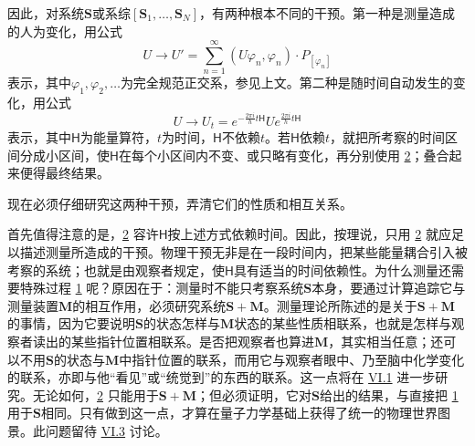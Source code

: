 \documentclass[fontsize=13pt,twoside,openany,headings=normal,parskip=false,bookmarkpackage=false,DIV=calc]{scrbook}
\begin{document}
因此，对系统$\boldsymbol{S}$或系综$[\boldsymbol{S}_1,\allowbreak \ldots,\allowbreak \boldsymbol{S}_N]$，有两种根本不同的干预。第一种是测量造成的人为变化，用公式
\begin{equation}\tag{1}\label{eq:V.1.1}
U\longrightarrow U'=\sum_{n=1}^{\infty}(U\varphi_n,\varphi_n)\cdot P_{[\varphi_n]}
\end{equation}
表示，其中$\varphi_1,\allowbreak \varphi_2,\allowbreak \ldots$为完全规范正交系，参见上文。第二种是随时间自动发生的变化，用公式
\begin{equation}\tag{2}\label{eq:V.1.2}
U\longrightarrow U_t=e^{-\frac{2\pi i}{h}t\mathsf{H}}Ue^{\frac{2\pi i}{h}t\mathsf{H}}
\end{equation}\hypertarget{origpage-187}{}\label{origpage-187}表示，其中$\mathsf{H}$为能量算符，$t$为时间，$\mathsf{H}$不依赖$t$。若$\mathsf{H}$依赖$t$，就把所考察的时间区间分成小区间，使$\mathsf{H}$在每个小区间内不变、或只略有变化，再分别使用 \hyperref[eq:V.1.2]{2}；叠合起来便得最终结果。

现在必须仔细研究这两种干预，弄清它们的性质和相互关系。

首先值得注意的是，\hyperref[eq:V.1.2]{2} 容许$\mathsf{H}$按上述方式依赖时间。因此，按理说，只用 \hyperref[eq:V.1.2]{2} 就应足以描述测量所造成的干预。物理干预无非是在一段时间内，把某些能量耦合引入被考察的系统；也就是由观察者规定，使$\mathsf{H}$具有适当的时间依赖性。为什么测量还需要特殊过程 \hyperref[eq:V.1.1]{1} 呢？原因在于：测量时不能只考察系统$\boldsymbol{S}$本身，要通过计算追踪它与测量装置$\boldsymbol{M}$的相互作用，必须研究系统$\boldsymbol{S}+\boldsymbol{M}$。测量理论所陈述的是关于$\boldsymbol{S}+\boldsymbol{M}$的事情，因为它要说明$\boldsymbol{S}$的状态怎样与$\boldsymbol{M}$状态的某些性质相联系，也就是怎样与观察者读出的某些指针位置相联系。是否把观察者也算进$\boldsymbol{M}$，其实相当任意；还可以不用$\boldsymbol{S}$的状态与$\boldsymbol{M}$中指针位置的联系，而用它与观察者眼中、乃至脑中化学变化的联系，亦即与他“看见”或“统觉到”的东西的联系。这一点将在 \hyperref[sec:VI.1]{VI.1} 进一步研究。无论如何，\hyperref[eq:V.1.2]{2} 只能用于$\boldsymbol{S}+\boldsymbol{M}$；但必须证明，它对$\boldsymbol{S}$给出的结果，与直接把 \hyperref[eq:V.1.1]{1} 用于$\boldsymbol{S}$相同。只有做到这一点，才算在量子力学基础上获得了统一的物理世界图景。此问题留待 \hyperref[sec:VI.3]{VI.3} 讨论。
\end{document}
